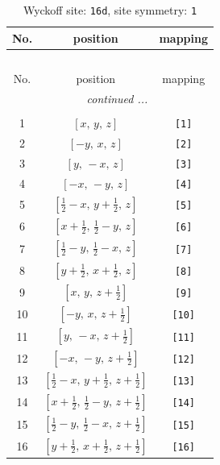 \documentclass[fleqn,8pt]{jsarticle}
\begin{document}
\begin{longtable}{ccc}
\caption{Wyckoff site: {\tt 16d}, site symmetry: {\tt 1}}
 \\
 \hline \hline
No. & position & mapping \\ \hline \endfirsthead

\multicolumn{2}{l}{\tablename\ \thetable{}} \\
 \hline \hline
No. & position & mapping \\ \hline \endhead

 \hline \hline
\multicolumn{2}{r}{\footnotesize\it continued ...} \\ \endfoot

 \hline \hline
\multicolumn{2}{r}{} \\ \endlastfoot

1 & $\left[ x,\, y,\, z \right]$ & {\tt [1]} \\ \hline
2 & $\left[ - y,\, x,\, z \right]$ & {\tt [2]} \\ \hline
3 & $\left[ y,\, - x,\, z \right]$ & {\tt [3]} \\ \hline
4 & $\left[ - x,\, - y,\, z \right]$ & {\tt [4]} \\ \hline
5 & $\left[ \frac{1}{2} - x,\, y + \frac{1}{2},\, z \right]$ & {\tt [5]} \\ \hline
6 & $\left[ x + \frac{1}{2},\, \frac{1}{2} - y,\, z \right]$ & {\tt [6]} \\ \hline
7 & $\left[ \frac{1}{2} - y,\, \frac{1}{2} - x,\, z \right]$ & {\tt [7]} \\ \hline
8 & $\left[ y + \frac{1}{2},\, x + \frac{1}{2},\, z \right]$ & {\tt [8]} \\ \hline
9 & $\left[ x,\, y,\, z + \frac{1}{2} \right]$ & {\tt [9]} \\ \hline
10 & $\left[ - y,\, x,\, z + \frac{1}{2} \right]$ & {\tt [10]} \\ \hline
11 & $\left[ y,\, - x,\, z + \frac{1}{2} \right]$ & {\tt [11]} \\ \hline
12 & $\left[ - x,\, - y,\, z + \frac{1}{2} \right]$ & {\tt [12]} \\ \hline
13 & $\left[ \frac{1}{2} - x,\, y + \frac{1}{2},\, z + \frac{1}{2} \right]$ & {\tt [13]} \\ \hline
14 & $\left[ x + \frac{1}{2},\, \frac{1}{2} - y,\, z + \frac{1}{2} \right]$ & {\tt [14]} \\ \hline
15 & $\left[ \frac{1}{2} - y,\, \frac{1}{2} - x,\, z + \frac{1}{2} \right]$ & {\tt [15]} \\ \hline
16 & $\left[ y + \frac{1}{2},\, x + \frac{1}{2},\, z + \frac{1}{2} \right]$ & {\tt [16]} \\
\end{longtable}
\end{document}
